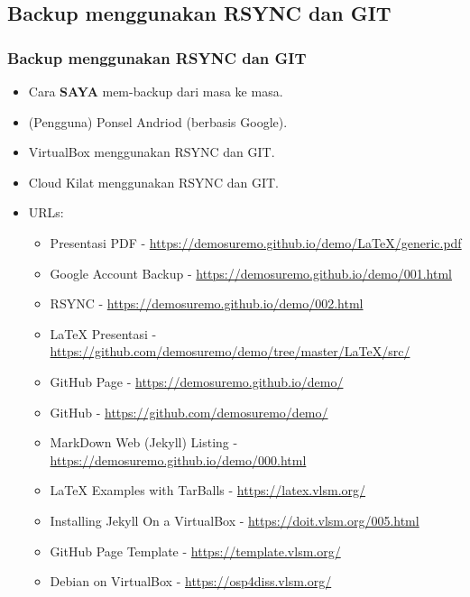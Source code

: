 \documentclass[xcolor=table, notheorems, hyperref={pdfpagelabels=false}]{beamer}
\begin{document}
\begin{frame}[fragile]
\section{Backup menggunakan RSYNC dan GIT}
\frametitle{Backup menggunakan RSYNC dan GIT}
\begin{itemize}
\item Cara \textbf{SAYA} mem-backup dari masa ke masa.
\item (Pengguna) Ponsel Andriod (berbasis Google).
\item VirtualBox menggunakan RSYNC dan GIT.
\item Cloud Kilat menggunakan RSYNC dan GIT.
\item URLs:
\begin{itemize}
\item Presentasi PDF - {\scriptsize \url{https://demosuremo.github.io/demo/LaTeX/generic.pdf}}
\item Google Account Backup - {\scriptsize \url{https://demosuremo.github.io/demo/001.html}}
\item RSYNC - {\scriptsize \url{https://demosuremo.github.io/demo/002.html}}
\item LaTeX Presentasi - {\tiny \url{https://github.com/demosuremo/demo/tree/master/LaTeX/src/}}
\item GitHub Page - \url{https://demosuremo.github.io/demo/}
\item GitHub - \url{https://github.com/demosuremo/demo/}
\item MarkDown Web (Jekyll) Listing - {\tiny \url{https://demosuremo.github.io/demo/000.html}}
\item LaTeX Examples with TarBalls - \url{https://latex.vlsm.org/}
\item Installing Jekyll On a VirtualBox  {\scriptsize - \url{https://doit.vlsm.org/005.html}}
\item GitHub Page Template - \url{https://template.vlsm.org/}
\item Debian on VirtualBox - \url{https://osp4diss.vlsm.org/}
\end{itemize}
\end{itemize}
\end{frame}
\end{document}
